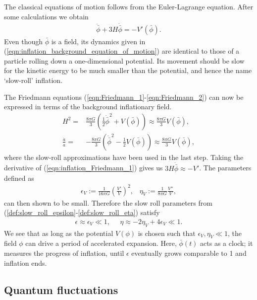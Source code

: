 The classical equations of motion follows from the Euler-Lagrange equation. After some calculations we obtain
\begin{align}
	\ddot{\bar{\phi}} + 3H\dot{\bar{\phi}} = - V'(\bar{\phi}). 	  \label{eqn:inflation_background_equation_of_motion}
\end{align}
Even though $\bar{\phi}$ is a field, its dynamics given in (\ref{eqn:inflation_background_equation_of_motion}) are identical to those of a particle rolling down a one-dimensional potential. Its movement should be slow for the kinetic energy to be much smaller than the potential, and hence the name `slow-roll' inflation.

The Friedmann equations (\ref{eqn:Friedmann_1}-\ref{eqn:Friedmann_2}) can now be expressed in terms of the background inflationary field.
\begin{align}
	H^2 =& \frac{8\pi G}{3} \left( \frac{1}{2} \dot{\bar{\phi}}^2 + V(\bar{\phi}) \right) \approx \frac{8\pi G}{3} V(\bar{\phi}), \label{eqn:inflation_Friedmann_1} \\
	\frac{\ddot{a}}{a} =& -\frac{8\pi G}{3} \left( \dot{\bar{\phi}}^2 - \frac{1}{2} V(\bar{\phi}) \right) \approx \frac{8\pi G}{3} V(\bar{\phi}), \label{eqn:inflation_Friedmann_2}
\end{align}
where the slow-roll approximations have been used in the last step. Taking the derivative of (\ref{eqn:inflation_Friedmann_1}) gives us $3H\dot{\bar{\phi}} \approx -V'$. The parameters defined as
\begin{align}
	\epsilon_V := \frac{1}{16\pi G} \left( \frac{V'}{V} \right)^2, \;\;\;
	\eta_V := \frac{1}{8\pi G} \frac{V''}{V},
\end{align}
can then shown to be small. Therefore the slow roll parameters from (\ref{def:slow_roll_epsilon}-\ref{def:slow_roll_eta}) satisfy
\begin{align}
	\epsilon \approx \epsilon_V \ll 1, \;\;\;\;\; \eta \approx -2\eta_V + 4\epsilon_V \ll 1.
\end{align}
We see that as long as the potential $V(\phi)$ is chosen such that $\epsilon_V, \eta_V \ll 1$, the field $\phi$ can drive a period of accelerated expansion. Here, $\bar{\phi}(t)$ acts as a clock; it measures the progress of inflation, until $\epsilon$ eventually grows comparable to 1 and inflation ends.

\subsection{Quantum fluctuations} \label{section:quantum_fluctuations}

